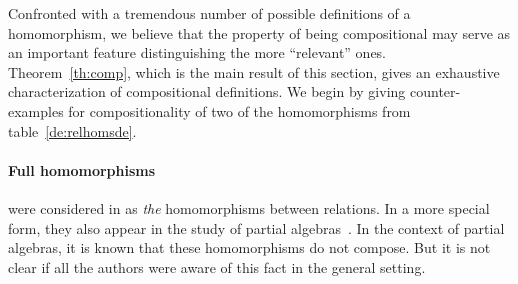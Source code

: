 \documentclass[10pt]{article}
\begin{document}


Confronted with a tremendous number of possible definitions of a
homomorphism, we believe that the property of being compositional may
serve as an important feature distinguishing the more ``relevant''
ones. Theorem~\ref{th:comp}, which is the main result of this section, 
gives an exhaustive characterization of
compositional definitions.  We
begin by giving counter-examples for compositionality of two of the
homomorphisms from table~\ref{de:relhomsde}. 
%
\paragraph{Full homomorphisms}
were considered in \cite{Most,Los:relhoms} as {\em
the} homomorphisms between relations. In a more special form, they also appear 
in the study of partial algebras~\cite{Burmeister}. In the context of partial algebras,
 it is known that these homomorphisms do not compose. But it is not clear if all the
authors were aware of this fact in the general setting. 

\end{document}
